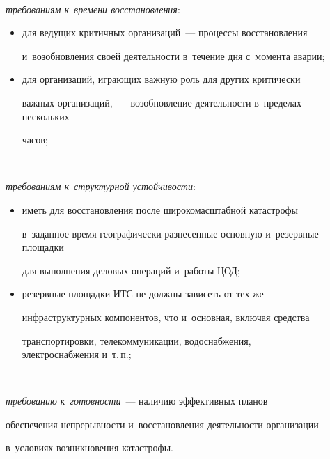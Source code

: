   \begin{description}


  \item[\,] \textit{требованиям к~времени восстановления}:


  \begin{itemize}


  \item  для ведущих критичных организаций~--- процессы восстановления 


и~возобновления своей деятельности в~течение дня с~момента аварии;


  \item для организаций, играющих важную роль для других критически 


важных организаций,~--- возобновление деятельности в~пределах нескольких 


часов;


  \end{itemize}


  


 \item[\,] \textit{требованиям к~структурной устойчивости}:


  \begin{itemize}


  \item иметь для восстановления после широкомасштабной катастрофы 


в~заданное время географически разнесенные основную и~резервные площадки 


для выполнения деловых операций и~работы ЦОД;


  \item резервные площадки ИТС не должны зависеть от тех же 


инфраструктурных компонентов, что и~основная, включая средства 


транспортировки, телекоммуникации, водоснабжения, электроснабжения и~т.\,п.;


  \end{itemize}


  


\item[\,]  \textit{требованию к~готовности}~--- наличию эффективных планов 


обеспечения непрерывности и~восстановления деятельности организации 


в~условиях возникновения катастрофы.


\end{description}


